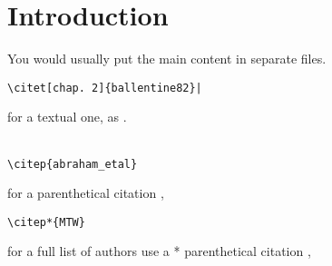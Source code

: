 \documentclass[12pt,a4paper]{book}      %
\begin{document}



\chapter{Introduction}
You would usually put the main content in separate files.
% 


\begin{verbatim}\citet[chap. 2]{ballentine82}|
\end{verbatim}
for a textual one, as \citet[chap. 2]{ballentine82}.\\
 \\
\begin{verbatim}\citep{abraham_etal}
 \end{verbatim}
 for a parenthetical citation \citep{abraham_etal},\\

 \begin{verbatim}\citep*{MTW}
 \end{verbatim}
 for a full list of authors use a * parenthetical citation \citep*{MTW},\\
 \\
\end{document}
